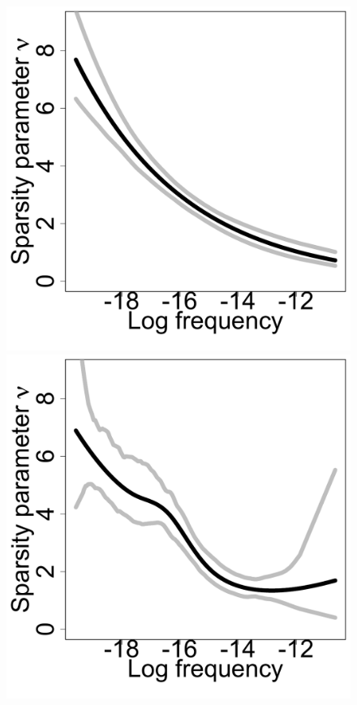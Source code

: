 \documentclass[10pt,letterpaper]{article}
\begin{document}

\begin{figure}[h]
\centering
\includegraphics[scale=.2]{nu.pdf}\includegraphics[scale=.2]{nu-splines.pdf}

\end{figure}
\end{document}
